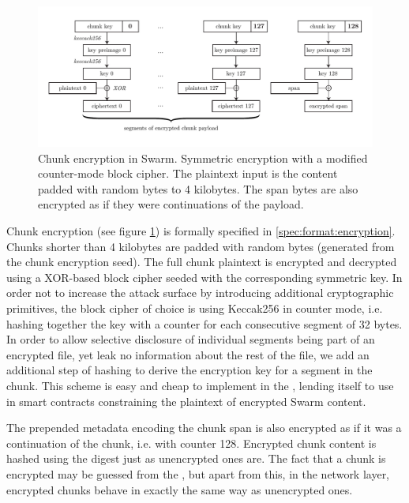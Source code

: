 \begin{figure}[htbp]
    \centering
    \includegraphics[width=\textwidth]{fig/chunk-encryption.pdf}
    \caption[Chunk encryption in Swarm \statusgreen]{Chunk encryption in Swarm. Symmetric encryption with a modified counter-mode block cipher. The plaintext input is the content padded with random bytes to 4 kilobytes. The span bytes are also encrypted as if they were continuations of the payload.}
    \label{fig:chunk-encryption}
\end{figure}


Chunk encryption (see figure \ref{fig:chunk-encryption}) is formally specified in \ref{spec:format:encryption}. Chunks shorter than 4 kilobytes are padded with random bytes (generated from the chunk encryption seed). The full chunk plaintext is encrypted and decrypted using a XOR-based block cipher seeded with the corresponding symmetric key. In order not to increase the attack surface by introducing additional cryptographic primitives, the block cipher of choice is using Keccak256 in counter mode, i.e. hashing together the key with a counter for each consecutive segment of 32 bytes. In order to allow selective disclosure of individual segments being part of an encrypted file, yet leak no information about the rest of the file, we add an additional step of hashing to derive the encryption key for a segment in the chunk. This scheme is easy and cheap to implement in the , lending itself to use in smart contracts constraining the plaintext of encrypted Swarm content. 

The prepended metadata encoding the chunk span is also encrypted as if it was a continuation of the chunk, i.e. with counter 128. Encrypted chunk content is hashed using the  digest just as unencrypted ones are. The fact that a chunk is encrypted may be guessed from the , but apart from this, in the network layer, encrypted chunks behave in exactly the same way as unencrypted ones.

